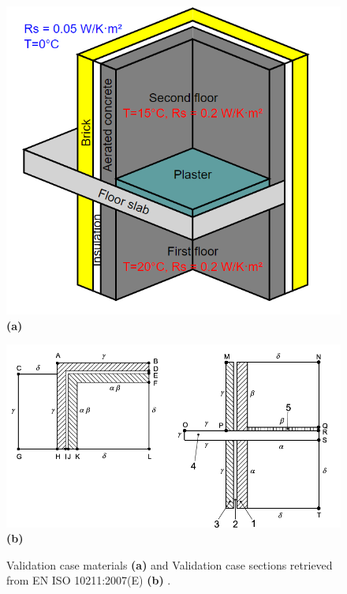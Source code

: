 \begin{figure}[H]
    \centering
    \begin{minipage}[t]{0.54\columnwidth}
        \centering
        \includegraphics[width=\linewidth]{Figures/validationcase}
        \textbf{(a)}
    \end{minipage}
    \hfill
    \begin{minipage}[t]{0.8\linewidth}
        \centering
        \includegraphics[width=\linewidth]{Figures/isodesc.png}
        \textbf{(b)}
    \end{minipage}
    
    \caption[3D Validation Materials]{Validation case materials \cite{ISO} \textbf{(a)} and Validation case sections retrieved from EN ISO 10211:2007(E) \textbf{(b)} \cite{ISO}.}
    \label{fig:validation-case-materials}
\end{figure}









